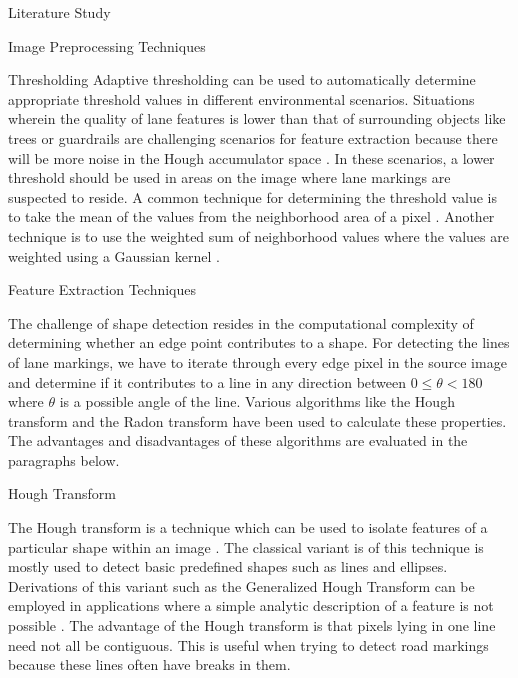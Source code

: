 \documentclass{matthijs}
\begin{document}
\begin{hoofdstuk}{Literature Study}
\begin{paragraaf}{Image Preprocessing Techniques}
\begin{subparagraaf}{Thresholding}
				Adaptive thresholding can be used to automatically determine appropriate threshold values in different environmental scenarios.
				Situations wherein the quality of lane features is lower than that of surrounding objects like trees or guardrails are challenging scenarios for feature extraction because there will be more noise in the Hough accumulator space \cite{son2019robust}.
				In these scenarios, a lower threshold should be used in areas on the image where lane markings are suspected to reside.
				A common technique for determining the threshold value is to take the mean of the values from the neighborhood area of a pixel \cite{yuan2018robust}.
				Another technique is to use the weighted sum of neighborhood values where the values are weighted using a Gaussian kernel \cite{soeleman2020adaptive}.

			\end{subparagraaf}

		\end{paragraaf}

		\begin{paragraaf}{Feature Extraction Techniques}

			The challenge of shape detection resides in the computational complexity of determining whether an edge point contributes to a shape.
			For detecting the lines of lane markings, we have to iterate through every edge pixel in the source image and determine if it contributes to a line in any direction between $0 \leq \theta < 180$ where $\theta$ is a possible angle of the line.
			Various algorithms like the Hough transform and the Radon transform have been used to calculate these properties.
			The advantages and disadvantages of these algorithms are evaluated in the paragraphs below.

			\begin{subparagraaf}{Hough Transform}

				The Hough transform is a technique which can be used to isolate features of a particular shape within an image \cite{fisher2003hypermedia}.
				The classical variant is of this technique is mostly used to detect basic predefined shapes such as lines and ellipses.
				Derivations of this variant such as the Generalized Hough Transform can be employed in applications where a simple analytic description of a feature is not possible \cite{fisher2003hypermedia}.
				The advantage of the Hough transform is that pixels lying in one line need not all be contiguous.\cite{kahl2000hough}
				This is useful when trying to detect road markings because these lines often have breaks in them.


\end{subparagraaf}
\end{paragraaf}
\end{hoofdstuk}
\end{document}
